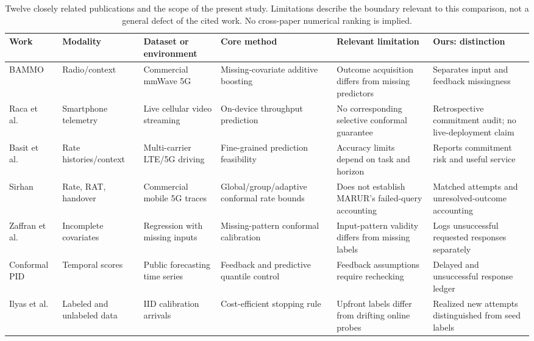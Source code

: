\begin{table}[t]
\caption{Twelve closely related publications and the scope of the present study. Limitations describe the boundary relevant to this comparison, not a general defect of the cited work. No cross-paper numerical ranking is implied.}
\label{tab:related_comparison}
\centering
\footnotesize
\setlength{\tabcolsep}{3pt}
\renewcommand{\arraystretch}{1.12}
\begin{tabularx}{\textwidth}{@{}>{\raggedright\arraybackslash}p{}>{\raggedright\arraybackslash}p{}>{\raggedright\arraybackslash}p{}>{\raggedright\arraybackslash}X>{\raggedright\arraybackslash}X>{\raggedright\arraybackslash}X@{}}
\hline
\textbf{Work} & \textbf{Modality} & \textbf{Dataset or environment} & \textbf{Core method} & \textbf{Relevant limitation} & \textbf{Ours: distinction} \\
\hline
BAMMO~\cite{jacobson2025} & Radio/context & Commercial mmWave 5G & Missing-covariate additive boosting & Outcome acquisition differs from missing predictors & Separates input and feedback missingness \\
Raca et al.~\cite{raca2024} & Smartphone telemetry & Live cellular video streaming & On-device throughput prediction & No corresponding selective conformal guarantee & Retrospective commitment audit; no live-deployment claim \\
Basit et al.~\cite{basit2024} & Rate histories/context & Multi-carrier LTE/5G driving & Fine-grained prediction feasibility & Accuracy limits depend on task and horizon & Reports commitment risk and useful service \\
Sirhan~\cite{sirhan2026} & Rate, RAT, handover & Commercial mobile 5G traces & Global/group/adaptive conformal rate bounds & Does not establish MARUR's failed-query accounting & Matched attempts and unresolved-outcome accounting \\
Zaffran et al.~\cite{zaffran2023} & Incomplete covariates & Regression with missing inputs & Missing-pattern conformal calibration & Input-pattern validity differs from missing labels & Logs unsuccessful requested responses separately \\
Conformal PID~\cite{pid2023} & Temporal scores & Public forecasting time series & Feedback and predictive quantile control & Feedback assumptions require rechecking & Delayed and unsuccessful response ledger \\
Ilyas et al.~\cite{ilyas2026} & Labeled and unlabeled data & IID calibration arrivals & Cost-efficient stopping rule & Upfront labels differ from drifting online probes & Realized new attempts distinguished from seed labels \\

\end{tabularx}
\end{table}
